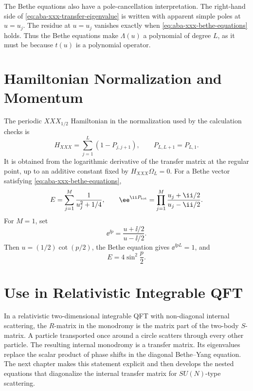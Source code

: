 The Bethe equations also have a pole-cancellation interpretation.  The
right-hand side of \eqref{eq:aba-xxx-transfer-eigenvalue} is written with
apparent simple poles at \(u=u_j\).  The residue at \(u=u_j\) vanishes exactly
when \eqref{eq:aba-xxx-bethe-equations} holds.  Thus the Bethe equations make
\(\Lambda(u)\) a polynomial of degree \(L\), as it must be because \(t(u)\) is
a polynomial operator.

\section{Hamiltonian Normalization and Momentum}

The periodic \(XXX_{1/2}\) Hamiltonian in the normalization used by the
calculation checks is
\[
  H_{XXX}=\sum_{j=1}^L(1-P_{j,j+1}),\qquad P_{L,L+1}=P_{L,1}.
\]
It is obtained from the logarithmic derivative of the transfer matrix at the
regular point, up to an additive constant fixed by
\(H_{XXX}\Omega_L=0\).  For a Bethe vector satisfying
\eqref{eq:aba-xxx-bethe-equations},
\begin{equation}
  E=\sum_{j=1}^M \frac{1}{u_j^2+1/4},
  \qquad
  \ee^{\ii P_{\rm tot}}
  =
  \prod_{j=1}^M
  \frac{u_j+\ii/2}{u_j-\ii/2}.
  \label{eq:aba-xxx-energy-momentum}
\end{equation}
For \(M=1\), set
\[
  \ee^{\ii p}=\frac{u+\ii/2}{u-\ii/2}.
\]
Then \(u=(1/2)\cot(p/2)\), the Bethe equation gives
\(\ee^{\ii pL}=1\), and
\[
  E=4\sin^2\frac p2 .
\]

\section{Use in Relativistic Integrable QFT}

In a relativistic two-dimensional integrable QFT with non-diagonal internal
scattering, the \(R\)-matrix in the monodromy is the matrix part of the
two-body \(S\)-matrix.  A particle transported once around a circle scatters
through every other particle.  The resulting internal monodromy is a transfer
matrix.  Its eigenvalues replace the scalar product of phase shifts in the
diagonal Bethe--Yang equation.  The next chapter makes this statement
explicit and then develops the nested equations that diagonalize the internal
transfer matrix for \(SU(N)\)-type scattering.
